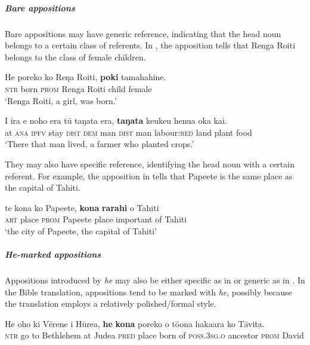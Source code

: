 \subparagraph{Bare appositions} Bare appositions may have generic reference, indicating that the head noun belongs to a certain class of referents. In , the apposition tells that Renga Roiti belongs to the class of female children. 

\ea\label{ex:5.165}
\gll He poreko ko Reŋa Roiti, \textbf{poki} tamahahine. \\
\textsc{ntr} born \textsc{prom} Renga Roiti child female \\

\glt 
‘Renga Roiti, a girl, was born.’ \textstyleExampleref{[Mtx-7-15.002]}
\z

\ea\label{ex:5.166}
\gll {\ꞌ}I ira e noho era tū taŋata era, \textbf{taŋata} keukeu henua {\ꞌ}oka kai. \\
at \textsc{ana} \textsc{ipfv} stay \textsc{dist} \textsc{dem} man \textsc{dist} man labour:\textsc{red} land plant food \\

\glt
‘There that man lived, a farmer who planted crops.’ \textstyleExampleref{[R372.036]} 
\z

They may also have specific reference, identifying the head noun with a certain referent. For example, the apposition in  tells that Papeete is the same place as the capital of Tahiti.

\ea\label{ex:5.167}
\gll te kona ko Pape{\ꞌ}ete, \textbf{kona} \textbf{rarahi} o Tahiti \\
\textsc{art} place \textsc{prom} Papeete place important of Tahiti \\

\glt 
‘the city of Papeete, the capital of Tahiti’ \textstyleExampleref{[R231.045]} 
\z

\subparagraph{\textit{He}-marked appositions} Appositions introduced by \textit{he} may also be either specific as in  or generic as in . In the Bible translation, appositions tend to be marked with \textit{he}, possibly because the translation employs a relatively polished/formal style.

\ea\label{ex:5.168}
\gll He oho ki Vērene {\ꞌ}i Hūrea, \textbf{he} \textbf{kona} poreko o tō{\ꞌ}ona hakaara  ko Tāvita.\\
\textsc{ntr} go to Bethlehem at Judea \textsc{pred} place born of \textsc{poss.3sg.o} ancestor  \textsc{prom} David\\

